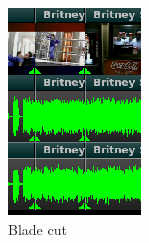 \begin{figure}
    \vspace{-1ex}
    \centering
    \includegraphics[width=0.9\linewidth]{images/cut.png}
    \caption{Blade cut}
    \label{fig:cut}
\end{figure}


